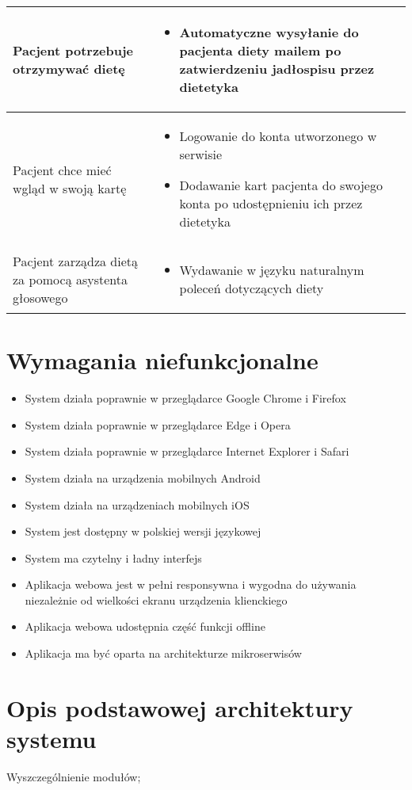 \begin{minipage}{\textwidth}
\begin{table}[H]
\begin{tabular}{|p{}|p{}|}
            \hline
            Pacjent potrzebuje otrzymywać dietę &
            \begin{itemize}
                \item Automatyczne wysyłanie do pacjenta diety mailem po zatwierdzeniu jadłospisu przez dietetyka
            \end{itemize} \\
            \hline
            Pacjent chce mieć wgląd w swoją kartę &
            \begin{itemize}
                \item Logowanie do konta utworzonego w serwisie
                \item Dodawanie kart pacjenta do swojego konta po udostępnieniu ich przez dietetyka
            \end{itemize} \\
            \hline
            Pacjent zarządza dietą za pomocą asystenta głosowego &
            \begin{itemize}
                \item Wydawanie w języku naturalnym poleceń dotyczących diety
            \end{itemize} \\
            \hline
        \end{tabular}
    \end{table}
\end{minipage}

\newpage

\section{Wymagania niefunkcjonalne}
\begin{itemize}
    \item System działa poprawnie w przeglądarce Google Chrome i Firefox
    \item System działa poprawnie w przeglądarce Edge i Opera
    \item System działa poprawnie w przeglądarce Internet Explorer i Safari
    \item System działa na urządzenia mobilnych Android
    \item System działa na urządzeniach mobilnych iOS
    \item System jest dostępny w polskiej wersji językowej
    \item System ma czytelny i ładny interfejs
    \item Aplikacja webowa jest w pełni responsywna i wygodna do używania niezależnie od wielkości ekranu urządzenia klienckiego
    \item Aplikacja webowa udostępnia część funkcji offline
    \item Aplikacja ma być oparta na architekturze mikroserwisów
\end{itemize}

\section{Opis podstawowej architektury systemu}

Wyszczególnienie modułów;

\thispagestyle{normal}
